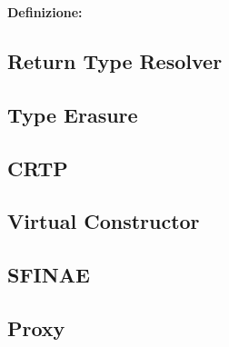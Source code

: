 \textsf{\small \textbf{Definizione: } } \\ %

\subsection{Return Type Resolver}

\subsection{Type Erasure}

\subsection{CRTP}

\subsection{Virtual Constructor}

\subsection{SFINAE}


\subsection{Proxy}

